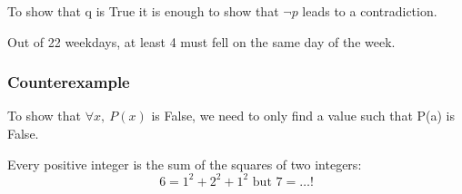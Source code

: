 \documentclass[12pt, a4paper]{book}
\begin{document}
To show that q is True it is enough to show that $\lnot p$ leads to a contradiction.

\begin{exmp}
    Out of 22 weekdays, at least 4 must fell on the same day of the week.
\end{exmp}

\subsubsection*{Counterexample}
To show that $\forall x, \ P(x)$ is False, we need to only find a value such that P(a) is False.

\begin{exmp}
    Every positive integer is the sum of the squares of two integers:
    $$6=1^2+2^2+1^2 \text{ but } 7=\ldots !$$
\end{exmp}
\end{document}

